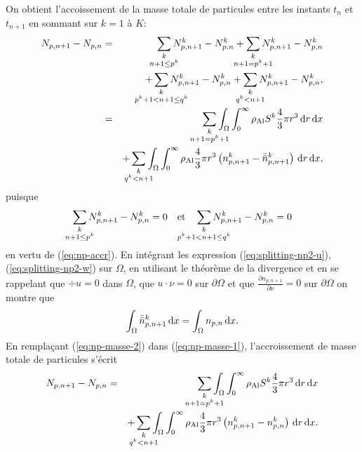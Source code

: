 On obtient l'accoissement de la masse totale de particules entre les
instants $t_n$ et $t_{n+1}$ en sommant sur $k = 1$ à $K$:
\begin{eqnarray}
  N_{p,n+1} - N_{p,n}
  &=& \sum_{\mathclap{\substack{k\\ n+1 \leq p^k}}} N_{p,n+1}^k - N_{p,n}^k %
  + \sum_{\mathclap{\substack{k\\ n+1 = p^k + 1}}} N_{p,n+1}^k - N_{p,n}^k \nonumber\\
  && + \sum_{\mathclap{\substack{k\\ p^k + 1 < n+1 \leq q^k}}} N_{p,n+1}^k - N_{p,n}^k %
  + \sum_{\mathclap{\substack{k\\ q^k < n+1}}} N_{p,n+1}^k - N_{p,n}^k,\nonumber\\
  &=&\sum_{\mathclap{\substack{k\\ n+1 = p^k+1}}} \displaystyle\int_\Omega\displaystyle\int_0^\infty \aluminadensity S^k\frac{4}{3}\pi
  r^3\intd{r}\intd{x} \nonumber\\
  && + \sum_{\mathclap{\substack{k \\ q^k < n+1}}} \displaystyle\int_\Omega\displaystyle\int_0^\infty \aluminadensity \frac{4}{3}\pi
    r^3\parent{n_{p,n+1}^k - \bar{\bar n}_{p,n+1}^k}\intd{r}\intd{x}, \label{eq:np-masse-1}
\end{eqnarray}
puisque
\begin{equation*}
\sum_{\mathclap{\substack{k\\ n+1 \leq p^k}}} N_{p,n+1}^k - N_{p,n}^k = 0 \quad \text{et}\quad \sum_{\mathclap{\substack{k\\ p^k + 1 < n+1 \leq q^k}}} N_{p,n+1}^k - N_{p,n}^k = 0
\end{equation*}
en vertu de (\ref{eq:np-accr}). En intégrant les expression (\ref{eq:splitting-np2-u}),
(\ref{eq:splitting-np2-w}) sur $\Omega$, en utilisant le théorème
de la divergence et en se rappelant que $\div u = 0$ dans $\Omega$,
que $u\cdot\nu = 0$ sur $\partial \Omega$ et que $\frac{\partial
  n_{p,n+1}}{\partial \nu} = 0$ sur $\partial \Omega$ on montre que
\begin{equation}\label{eq:np-masse-2}
  \int_\Omega \bar{\bar n}_{p,n+1}^k\,\mathrm dx = \int_\Omega n_{p,n}\,\mathrm dx.
\end{equation}
En remplaçant (\ref{eq:np-masse-2}) dans (\ref{eq:np-masse-1}),
l'accroissement de masse totale de particules s'écrit
\begin{eqnarray}\label{eq:np-masse-3}
  N_{p,n+1} - N_{p,n} &=&\sum_{\mathclap{\substack{k\\ n+1 = p^k+1}}} \displaystyle\int_\Omega\displaystyle\int_0^\infty \aluminadensity S^k\frac{4}{3}\pi
  r^3\intd{r}\intd{x} \nonumber\\
  && + \sum_{\mathclap{\substack{k \\ q^k < n+1}}} \displaystyle\int_\Omega\displaystyle\int_0^\infty \aluminadensity \frac{4}{3}\pi
    r^3\parent{n_{p,n+1}^k - n_{p,n}^k}\intd{r}\intd{x}.
\end{eqnarray}

